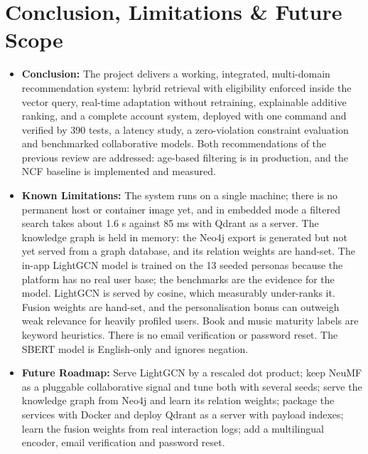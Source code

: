 \documentclass[11pt, a4paper]{article}
\begin{document}
\section{Conclusion, Limitations \& Future Scope}
\begin{itemize}[noitemsep, topsep=2pt]
    \item \textbf{Conclusion:} The project delivers a working, integrated, multi-domain recommendation system: hybrid retrieval with eligibility enforced inside the vector query, real-time adaptation without retraining, explainable additive ranking, and a complete account system, deployed with one command and verified by 390 tests, a latency study, a zero-violation constraint evaluation and benchmarked collaborative models. Both recommendations of the previous review are addressed: age-based filtering is in production, and the NCF baseline is implemented and measured.
    \item \textbf{Known Limitations:} The system runs on a single machine; there is no permanent host or container image yet, and in embedded mode a filtered search takes about 1.6 s against 85 ms with Qdrant as a server. The knowledge graph is held in memory: the Neo4j export is generated but not yet served from a graph database, and its relation weights are hand-set. The in-app LightGCN model is trained on the 13 seeded personas because the platform has no real user base; the benchmarks are the evidence for the model. LightGCN is served by cosine, which measurably under-ranks it. Fusion weights are hand-set, and the personalisation bonus can outweigh weak relevance for heavily profiled users. Book and music maturity labels are keyword heuristics. There is no email verification or password reset. The SBERT model is English-only and ignores negation.
    \item \textbf{Future Roadmap:} Serve LightGCN by a rescaled dot product; keep NeuMF as a pluggable collaborative signal and tune both with several seeds; serve the knowledge graph from Neo4j and learn its relation weights; package the services with Docker and deploy Qdrant as a server with payload indexes; learn the fusion weights from real interaction logs; add a multilingual encoder, email verification and password reset.
\end{itemize}

\end{document}
